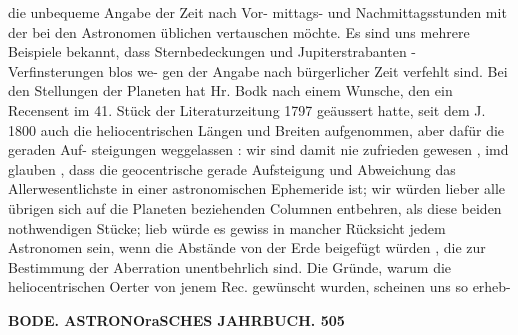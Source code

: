 \documentclass[12pt,a4paper]{article}
\begin{document}
die  unbequeme  Angabe  der  Zeit  nach  Vor- mittags- und  Nachmittagsstunden  mit  der  bei  den  Astronomen  üblichen  vertauschen  möchte.  Es  sind uns  mehrere  Beispiele  bekannt,  dass  Sternbedeckungen  und  Jupiterstrabanten  -  Verfinsterungen  blos  we- gen der  Angabe  nach  bürgerlicher  Zeit  verfehlt  sind.  Bei  den  Stellungen  der  Planeten  hat  Hr.  Bodk nach  einem  Wunsche,  den  ein  Recensent  im  41.  Stück  der  Literaturzeitung  1797  geäussert  hatte,  seit dem  J.  1800  auch  die  heliocentrischen  Längen  und  Breiten  aufgenommen,  aber  dafür  die  geraden  Auf- steigungen weggelassen :  wir  sind  damit  nie  zufrieden  gewesen ,  imd  glauben ,  dass  die  geocentrische gerade  Aufsteigung  und  Abweichung  das  Allerwesentlichste  in  einer  astronomischen  Ephemeride  ist; wir  würden  lieber  alle  übrigen  sich  auf  die  Planeten  beziehenden  Columnen  entbehren,  als  diese  beiden nothwendigen  Stücke;  lieb  würde  es  gewiss  in  mancher  Rücksicht  jedem  Astronomen  sein,  wenn  die Abstände  von  der  Erde  beigefügt  würden ,  die  zur  Bestimmung  der  Aberration  unentbehrlich  sind.  Die Gründe,  warum  die  heliocentrischen  Oerter  von  jenem  Rec.  gewünscht  wurden,  scheinen  uns  so  erheb-

\vspace{0.5em}


\noindent\textbf{BODE.     ASTRONOraSCHES  JAHRBUCH.  505}
\end{document}
